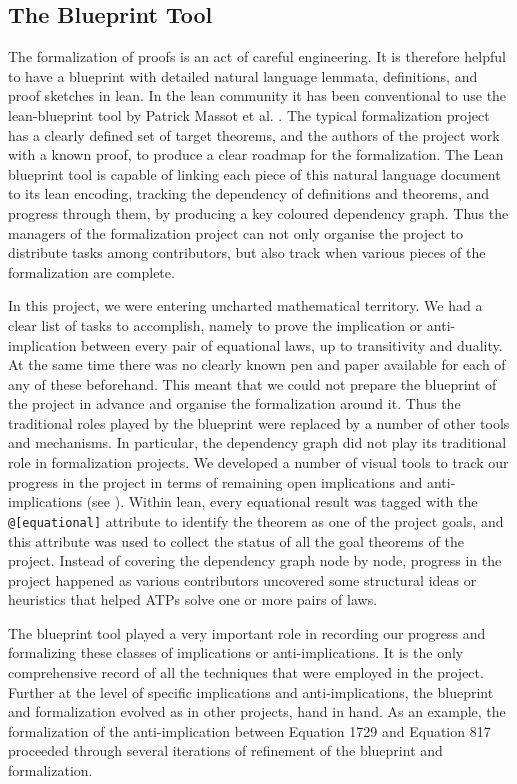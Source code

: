 \subsection{The Blueprint Tool}

The formalization of proofs is an act of careful engineering. It is therefore helpful to  have a blueprint with detailed natural language lemmata, definitions, and proof sketches in lean. In the lean community it has been conventional to use the lean-blueprint tool by Patrick Massot et al. \cite{GitHubGitHubPatrickMassotleanblueprint}. The typical formalization project has a clearly defined set of target theorems, and the authors of the project work with a known proof, to produce a clear roadmap for the formalization. The Lean blueprint tool is capable of linking each piece of this natural language document to its lean encoding, tracking the dependency of definitions and theorems, and progress through them, by producing a key coloured dependency graph. Thus the managers of the formalization project can not only organise the project to distribute tasks among contributors, but also track when various pieces of the formalization are complete.

In this project, we were entering uncharted mathematical territory. We had a clear list of tasks to accomplish, namely to prove the implication or anti-implication between every pair of equational laws, up to transitivity and duality. At the same time there was no clearly known pen and paper available for each of any of these beforehand. This meant that we could not prepare the blueprint of the project in advance and organise the formalization around it. Thus the traditional roles played by the blueprint were replaced by a number of other tools and mechanisms. In particular, the dependency graph did not play its traditional role in formalization projects. We developed a number of visual tools to track our progress in the project  in terms of remaining open implications and anti-implications (see ). Within lean, every equational result was tagged with the \texttt{@[equational]} attribute to identify the theorem as one of the project goals, and this attribute was used to collect the status of all the goal theorems of the project. Instead of covering the dependency graph node by node, progress in the project happened as various contributors uncovered some structural ideas or heuristics that helped ATPs solve one or more pairs of laws.

The blueprint tool played a very important role in recording our progress and formalizing these classes of implications or anti-implications. It is the only comprehensive record of all the techniques that were employed in the project. Further at the level of specific implications and anti-implications, the blueprint and formalization evolved as in other projects, hand in hand. As an example, the formalization of the anti-implication between Equation 1729 and Equation 817 proceeded through several iterations of refinement of the blueprint and formalization.

